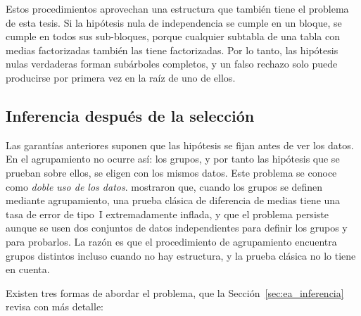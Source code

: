 Estos procedimientos aprovechan una estructura que también tiene el problema de
esta tesis. Si la hipótesis nula de independencia se cumple en un bloque, se
cumple en todos sus sub-bloques, porque cualquier subtabla de una tabla con medias
factorizadas también las tiene factorizadas. Por lo tanto, las hipótesis nulas
verdaderas forman subárboles completos, y un falso rechazo solo puede producirse
por primera vez en la raíz de uno de ellos.

\subsection{Inferencia después de la selección}\label{sec:est-seleccion}

Las garantías anteriores suponen que las hipótesis se fijan antes de ver los
datos. En el agrupamiento no ocurre así: los grupos, y por tanto las hipótesis que
se prueban sobre ellos, se eligen con los mismos datos. Este problema se conoce
como \emph{doble uso de los datos}. \cite{Gao2024} mostraron que, cuando los grupos
se definen mediante agrupamiento, una prueba clásica de diferencia de medias
tiene una tasa de error de tipo~I extremadamente inflada, y que el problema
persiste aunque se usen dos conjuntos de datos independientes para definir los
grupos y para probarlos. La razón es que el procedimiento de agrupamiento
encuentra grupos distintos incluso cuando no hay estructura, y la prueba clásica
no lo tiene en cuenta.

Existen tres formas de abordar el problema, que la Sección~\ref{sec:ea_inferencia}
revisa con más detalle:

